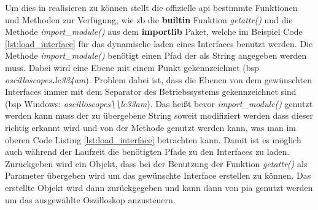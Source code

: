 Um dies in  realisieren zu können stellt die offizielle \ac{api} bestimmte Funktionen und Methoden zur Verfügung, wie \ac{zb} die \textbf{builtin} Funktion \textit{getattr()} und die Methode \textit{import\_module()} aus dem \textbf{importlib} Paket, welche im Beispiel Code \ref{lst:load_interface} für das dynamische laden eines Interfaces benutzt werden. Die Methode \textit{import\_module()} benötigt einen Pfad der als String angegeben werden muss. Dabei wird eine Ebene mit einem Punkt gekennzeichnet (\ac{bsp} \textit{oscilloscopes\textbf{.}lc334am}). Problem dabei ist, dass die Ebenen von dem gewünschten Interfaces immer mit dem Separator des Betriebssystems gekennzeichnet sind (\ac{bsp} Windows: \textit{oscilloscopes\textbf{\textbackslash\textbackslash}lc33am}). Das heißt bevor \textit{import\_module()} genutzt werden kann muss der zu übergebene String soweit modifiziert werden dass dieser richtig erkannt wird und von der Methode genutzt werden kann, was man im oberen Code Listing \ref{lst:load_interface} betrachten kann. Damit ist es möglich auch während der Laufzeit die benötigten Pfade zu den Interfaces zu laden. Zurückgeben wird ein Objekt, dass bei der Benutzung der Funktion \textit{getattr()} als Parameter übergeben wird um das gewünschte Interface erstellen zu können. Das erstellte Objekt wird dann zurückgegeben und kann dann von \ac{pia} genutzt werden um das ausgewählte Oszilloskop anzusteuern.
